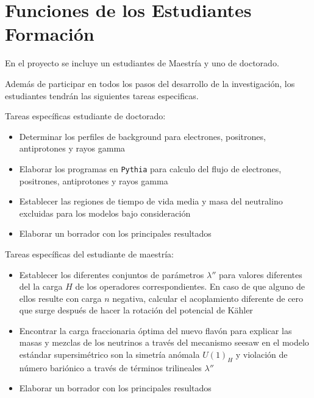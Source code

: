 \section{ Funciones de los Estudiantes Formación }



En el proyecto se incluye un estudiantes de Maestría y uno de doctorado.

Además de participar en todos los pasos del desarrollo de la
investigación, los estudiantes  tendrán las siguientes
tareas especificas.

Tareas específicas  estudiante de doctorado:
\begin{itemize}
\item Determinar los perfiles de background para electrones, positrones, antiprotones y rayos gamma
\item Elaborar los programas en \texttt{Pythia} para calculo del flujo de electrones, positrones, antiprotones y rayos gamma
\item Establecer las regiones de tiempo de vida media y masa del neutralino excluidas para los modelos bajo consideración
\item Elaborar un borrador con los principales resultados
\end{itemize}

Tareas específicas del estudiante de maestría:
\begin{itemize}
\item Establecer los diferentes conjuntos de parámetros $\lambda''$ para valores diferentes del la carga $H$ de los operadores correspondientes. En caso de que alguno de ellos resulte con carga $n$ negativa, calcular el acoplamiento diferente de cero que surge después de hacer la rotación del potencial de K\"ahler
\item Encontrar la carga fraccionaria óptima del nuevo flavón para explicar las masas y mezclas de los neutrinos a través del mecanismo seesaw en el modelo estándar supersimétrico son la simetría anómala $U(1)_H$ y violación de número bariónico a través de términos trilineales $\lambda''$
\item Elaborar un borrador con los principales resultados
\end{itemize}



